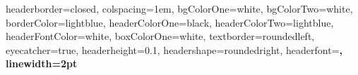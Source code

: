 \documentclass[landscape,a0paper,fontscale=0.285]{baposter} %
\begin{document}
\begin{poster}
{
headerborder=closed, %
colspacing=1em, %
bgColorOne=white, %
bgColorTwo=white, %
borderColor=lightblue, %
headerColorOne=black, %
headerColorTwo=lightblue, %
headerFontColor=white, %
boxColorOne=white, %
textborder=roundedleft, %
eyecatcher=true, %
headerheight=0.1\textheight, %
headershape=roundedright, %
headerfont=\Large\bf\textsc, %
linewidth=2pt %
}
\begin{columns}[T]
\begin{column}{.33\textwidth}


\end{column}
\end{columns}
\end{poster}
\end{document}
